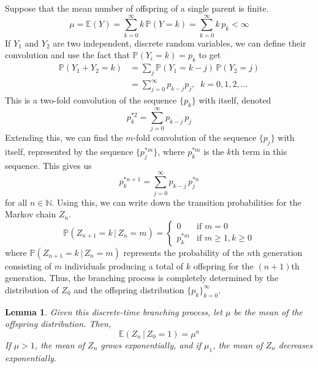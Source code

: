 \documentclass{article}
\newtheorem{lemma}[theorem]{Lemma}
\theoremstyle{remark}
\theoremstyle{definition}
\begin{document}
Suppose that the mean number of offspring of a single parent is finite. 
\[\mu = \mathbb{E}(Y) = \sum_{k=0}^\infty k \, \mathbb{P}(Y = k) = \sum_{k=0}^\infty k \, p_k < \infty\]
If $Y_1$ and $Y_2$ are two independent, discrete random variables, we can define their convolution and use the fact that $\mathbb{P}(Y_i = k) = p_k$ to get
\begin{align*}
    \mathbb{P}(Y_1 + Y_2 = k) & = \sum_j \mathbb{P}(Y_1 = k - j) \, \mathbb{P}(Y_2 = j) \\
    & = \sum_{j=0}^\infty p_{k-j} p_j, \;\; k = 0, 1, 2, ...
\end{align*}
This is a two-fold convolution of the sequence $\{p_k\}$ with itself, denoted
\[p_k^{*2} = \sum_{j=0}^\infty p_{k-j} \, p_j\]
Extending this, we can find the $m$-fold convolution of the sequence $\{p_j\}$ with itself, represented by the sequence $\{p_j^{*m}\}$, where $p_k^{*m}$ is the $k$th term in this sequence. This gives us
\[p_k^{*n+1} = \sum_{j=0}^\infty p_{k-j} \, p_j^{*n}\]
for all $n \in \mathbb{N}$. Using this, we can write down the transition probabilities for the Markov chain $Z_n$. 
\[\mathbb{P}(Z_{n+1} = k \, | \, Z_n = m) = \begin{cases}
0 & \text{if } m = 0 \\
p_k^{*m} & \text{if } m \geq 1, k \geq 0
\end{cases}\]
where $\mathbb{P}(Z_{n+1} = k \, | \, Z_n = m)$ represents the probability of the $n$th generation consisting of $m$ individuals producing a total of $k$ offspring for the $(n+1)$th generation. Thus, the branching process is completely determined by the distribution of $Z_0$ and the offspring distribution $\{p_k\}_{k=0}^\infty$. 

\begin{lemma}
Given this discrete-time branching process, let $\mu$ be the mean of the offspring distribution. Then, 
\[\mathbb{E}(Z_n \, | \, Z_0 = 1) = \mu^n\]
If $\mu > 1$, the mean of $Z_n$ grows exponentially, and if $\mu_1$, the mean of $Z_n$ decreases exponentially. 
\end{lemma}
\end{document}
